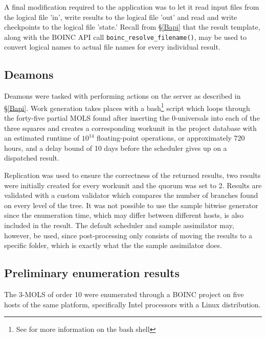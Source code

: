 A final modification required to the application was to let it read input files from the logical file  'in', write results to the logical file  'out' and read and write checkpoints to the logical file 'state.' Recall from \S\ref{Bapi} that the result template, along with the BOINC API call \verb|boinc_resolve_filename()|, may be used to convert logical names to actual file names for every individual result.

\subsection{Deamons} \label{5deamons}
Deamons were tasked with performing actions on the server as described in \S\ref{Bapi}. Work generation takes places with a bash\footnote{See \cite{bash} for more information on the bash shell} script which loops through the forty-five partial MOLS found after inserting the 0-universals into each of the three squares and creates a corresponding workunit in the project database with an estimated runtime of $10^{14}$ floating-point operations, or approximately 720 hours, and a delay bound of 10 days before the scheduler gives up on a dispatched result.

Replication was used to ensure the correctness of the returned results, two results were initially created for every workunit and the quorum was set to 2. Results are validated with a custom validator which compares the number of branches found on every level of the tree. It was not possible to use the sample bitwise generator since the enumeration time, which may differ between different hosts, is also included in the result.
The default scheduler and sample assimilator may, however, be used, since post-processing only consists of moving the results to a specific folder, which is exactly what the the sample assimilator does. 

\subsection{Preliminary enumeration results} \label{5pres}
The 3-MOLS of order 10 were enumerated through a BOINC project on five hosts of the same platform, specifically Intel processors with  a Linux distribution.



